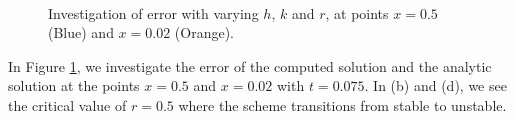 \documentclass{article}
\numberwithin{equation}{section}
\theoremstyle{definition}
\begin{document}
\begin{figure}[H]
    \centering
    \hfill
     \\
    \hfill
    \caption{Investigation of error with varying $h$, $k$ and $r$, at points $x=0.5$ (Blue) and $x=0.02$ (Orange).}
    \label{fig:afig1}
\end{figure}
In Figure \ref{fig:afig1}, we investigate the error of the computed solution and the analytic solution at the points $x=0.5$ and $x=0.02$ with $t=0.075$. In (b) and (d), we see the critical value of $r=0.5$ where the scheme transitions from stable to unstable.
\end{document}
